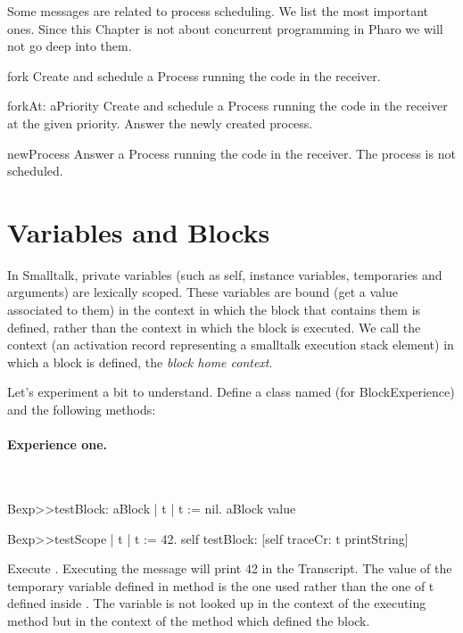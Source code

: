 \documentclass[a4paper,10pt,twoside]{book}
\begin{document}
Some messages are related to process scheduling. We list the most important ones. Since this Chapter is not about concurrent programming in Pharo we will not go deep into them.

\begin{description}
\item{\textsf{fork}} Create and schedule a Process running the code in the receiver.

\item{\textsf{forkAt: aPriority}} Create and schedule a Process running the code in the receiver at the given priority. Answer the newly created process. 

\item{\textsf{newProcess}} Answer a Process running the code in the receiver. The process is not scheduled.
\end{description}





\section{Variables and Blocks}
In Smalltalk, private variables (such as self, instance variables, temporaries and arguments) are 
lexically scoped. These variables are bound (get a value associated to them) in the context in which the block that contains them is defined, rather than the context in which the block is executed.  We call the context (an activation record representing a smalltalk execution stack element) in which a block is defined, the \emph{block home context}.


Let's experiment a bit to understand. Define a class named  (for BlockExperience) and the following methods:

\paragraph{Experience one.}\ 

\begin{code}{}
Bexp>>testBlock: aBlock 
	| t | 
	t := nil. 
	aBlock value 
	
Bexp>>testScope 
	| t | 
	t := 42. 
	self testBlock: [self traceCr: t printString] 
\end{code}

Execute . Executing the  message will print 42 in the Transcript. The value of the temporary variable  defined in method  is the one used rather than the one of t defined inside .
The variable  is not looked up in the context of the executing method  but in the context of the method  which defined the block.
\end{document}
